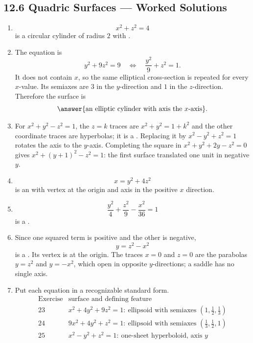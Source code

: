\subsection*{12.6 Quadric Surfaces --- Worked Solutions}
\begin{enumerate}[label=\textbf{\arabic*.}, start=3]
\item \[x^2+z^2=4\] is a circular cylinder of radius $2$ with .
\setcounter{enumi}{4}
\item The equation is
\[
y^2+9z^2=9
\quad\Longleftrightarrow\quad
\frac{y^2}{9}+z^2=1.
\]
It does not contain $x$, so the same elliptical cross-section is repeated for every $x$-value.  Its semiaxes are $3$ in the $y$-direction and $1$ in the $z$-direction.  Therefore the surface is
\[
\answer{\text{an elliptic cylinder with axis the }x\text{-axis}}.
\]
\setcounter{enumi}{10}
\item For $x^2+y^2-z^2=1$, the $z=k$ traces are $x^2+y^2=1+k^2$ and the other coordinate traces are hyperbolas; it is a . Replacing it by $x^2-y^2+z^2=1$ rotates the axis to the $y$-axis. Completing the square in $x^2+y^2+2y-z^2=0$ gives $x^2+(y+1)^2-z^2=1$: the first surface translated one unit in negative $y$.
\setcounter{enumi}{12}
\item \[x=y^2+4z^2\] is an  with vertex at the origin and axis in the positive $x$ direction.
\setcounter{enumi}{16}
\item \[\frac{y^2}{4}+\frac{z^2}{9}-\frac{x^2}{36}=1\] is a .
\setcounter{enumi}{20}
\item Since one squared term is positive and the other is negative,
\[
y=z^2-x^2
\]
is a .  Its vertex is at the origin.  The traces $x=0$ and $z=0$ are the parabolas $y=z^2$ and $y=-x^2$, which open in opposite $y$-directions; a saddle has no single axis.
\setcounter{enumi}{22}
\item Put each equation in a recognizable standard form.
\[
\begin{array}{c|l}
\text{Exercise}&\text{surface and defining feature}\\ \hline
23&x^2+4y^2+9z^2=1:\ \text{ellipsoid with semiaxes }(1,\tfrac12,\tfrac13)\\
24&9x^2+4y^2+z^2=1:\ \text{ellipsoid with semiaxes }(\tfrac13,\tfrac12,1)\\
25&x^2-y^2+z^2=1:\ \text{one-sheet hyperboloid, axis }y\\

\end{array}\]
\end{enumerate}

